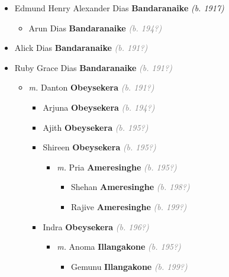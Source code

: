 \documentclass[10pt, openany]{book}
\begin{document}
\begin{itemize}
{\begin{itemize}
{\begin{itemize}
{\begin{itemize}
\item{Edmund Henry Alexander Dias \textbf{Bandaranaike} \textcolor{slorange}{\textit{(b. 1917)}}
\begin{itemize}
\item{Arun Dias \textbf{Bandaranaike} \textcolor{gray}{\textit{(b. 194?)}}
  }
\end{itemize}
    }
\item{Alick Dias  \textbf{Bandaranaike} \textcolor{gray}{\textit{(b. 191?)}}
  }
\item{Ruby Grace Dias \textbf{Bandaranaike} \textcolor{gray}{\textit{(b. 191?)}}
\begin{itemize}
\item{\textit{m.} Danton \textbf{Obeysekera} \textcolor{gray}{\textit{(b. 191?)}}   \label{couple:00002040:00003079} \begin{itemize}
\item{Arjuna  \textbf{Obeysekera} \textcolor{gray}{\textit{(b. 194?)}}
 }
\item{Ajith  \textbf{Obeysekera} \textcolor{gray}{\textit{(b. 195?)}}
 }
\item{Shireen  \textbf{Obeysekera} \textcolor{gray}{\textit{(b. 195?)}}
\begin{itemize}
\item{\textit{m.} Pria \textbf{Ameresinghe} \textcolor{gray}{\textit{(b. 195?)}}   \label{couple:00003081:00003082} \begin{itemize}
\item{Shehan \textbf{Ameresinghe} \textcolor{gray}{\textit{(b. 198?)}}
 }
\item{Rajive \textbf{Ameresinghe} \textcolor{gray}{\textit{(b. 199?)}}
 }
\end{itemize}}
\end{itemize}
 }
\item{Indra  \textbf{Obeysekera} \textcolor{gray}{\textit{(b. 196?)}}
\begin{itemize}
\item{\textit{m.} Anoma \textbf{Illangakone} \textcolor{gray}{\textit{(b. 195?)}}   \label{couple:00003085:00003086} \begin{itemize}
\item{Gemunu \textbf{Illangakone} \textcolor{gray}{\textit{(b. 199?)}}
}
\end{itemize}}
\end{itemize}}
\end{itemize}}
\end{itemize}}
\end{itemize}}
\end{itemize}}
\end{itemize}}
\end{itemize}
\end{document}
